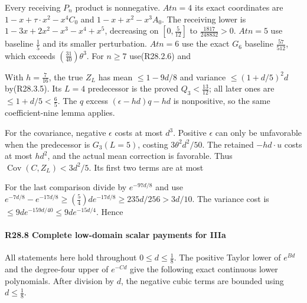 
Every receiving \(P_n\) product is nonnegative. \(At n=4\) its exact coordinates are \(1-x+\tau\cdot x^2-x^4C_0\) and \(1-x+x^2-x^3A_0\). The receiving lower is \(1-3x+2x^2-x^3-x^4+x^5\), decreasing on \([0,\allowbreak \allowbreak \frac{5}{12}]\) to \(\frac{1817}{248832}>0\). \(At n=5\) use baseline \(\frac{1}{5}\) and its smaller perturbation. \(At n=6\) use the exact \(G_{6}\) baseline \(\frac{57}{512}\), which exceeds \((\frac{31}{40})\theta^3\). For \(n\ge 7\) use(R28.2.6) and


With \(h=\frac{7}{16}\), the true \(Z_L\) has mean \(\le 1-9d/8\) and variance \(\le (1+d/5)^2d\) by(R28.3.5). Its \(L=4\) predecessor is the proved \(Q_{3}<\frac{13}{12}\); all later ones are \(\le 1+d/5<\frac{6}{5}\). The \(q\) excess \((\epsilon-hd)q-hd\) is nonpositive, so the same coefficient-nine lemma applies.

For the covariance, negative \(\epsilon\) costs at most \(d^3\). Positive \(\epsilon\) can only be unfavorable when the predecessor is \(G_{3} (L=5)\), costing \(3\theta^2d^2/50\). The retained \(-hd\cdot u\) costs at most \(hd^2\), and the actual mean correction is favorable. Thus \(\operatorname{Cov}(C,\allowbreak \allowbreak Z_L)<3d^2/5\). Its first two terms are at most


For the last comparison divide by \(e^{-97d/8}\) and use \(e^{-7d/8}-e^{-17d/8}\ge (\frac{5}{4})d e^{-17d/8}\ge 235d/256>3d/10\). The variance cost is \(\le 9d e^{-159d/40}\le 9d e^{-15d/4}\). Hence


\paragraph{R28.8 Complete low-domain scalar payments for IIIa}

All statements here hold throughout \(0\le d\le \frac{1}{8}\). The positive Taylor lower of \(e^{Bd}\) and the degree-four upper of \(e^{-Cd}\) give the following exact continuous lower polynomials. After division by \(d\), the negative cubic terms are bounded using \(d\le \frac{1}{8}\).

